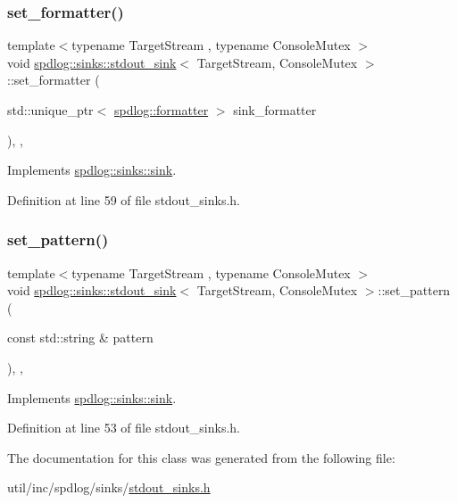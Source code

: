 \subsubsection{\texorpdfstring{set\+\_\+formatter()}{set\_formatter()}}
{\footnotesize\ttfamily template$<$typename Target\+Stream , typename Console\+Mutex $>$ \\
void \hyperlink{classspdlog_1_1sinks_1_1stdout__sink}{spdlog\+::sinks\+::stdout\+\_\+sink}$<$ Target\+Stream, Console\+Mutex $>$\+::set\+\_\+formatter (\begin{DoxyParamCaption}\item[{std\+::unique\+\_\+ptr$<$ \hyperlink{classspdlog_1_1formatter}{spdlog\+::formatter} $>$}]{sink\+\_\+formatter }\end{DoxyParamCaption})\hspace{0.3cm}{\ttfamily [inline]}, {\ttfamily [override]}, {\ttfamily [virtual]}}



Implements \hyperlink{classspdlog_1_1sinks_1_1sink_ac410f2229e583a75337a5fdf45d020be}{spdlog\+::sinks\+::sink}.



Definition at line 59 of file stdout\+\_\+sinks.\+h.

\mbox{\label{classspdlog_1_1sinks_1_1stdout__sink_a5b8759dab80ca44e9d185e21aa797d2a}} 
\subsubsection{\texorpdfstring{set\+\_\+pattern()}{set\_pattern()}}
{\footnotesize\ttfamily template$<$typename Target\+Stream , typename Console\+Mutex $>$ \\
void \hyperlink{classspdlog_1_1sinks_1_1stdout__sink}{spdlog\+::sinks\+::stdout\+\_\+sink}$<$ Target\+Stream, Console\+Mutex $>$\+::set\+\_\+pattern (\begin{DoxyParamCaption}\item[{const std\+::string \&}]{pattern }\end{DoxyParamCaption})\hspace{0.3cm}{\ttfamily [inline]}, {\ttfamily [override]}, {\ttfamily [virtual]}}



Implements \hyperlink{classspdlog_1_1sinks_1_1sink_a7e5cfd4b683c8bfa8fbd602d7f409632}{spdlog\+::sinks\+::sink}.



Definition at line 53 of file stdout\+\_\+sinks.\+h.



The documentation for this class was generated from the following file\+:\begin{DoxyCompactItemize}
\item 
util/inc/spdlog/sinks/\hyperlink{stdout__sinks_8h}{stdout\+\_\+sinks.\+h}\end{DoxyCompactItemize}
